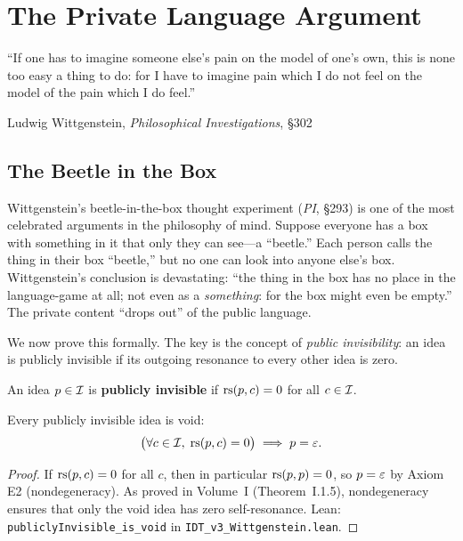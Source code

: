 
\chapter{The Private Language Argument}
\label{ch:private-language}

\epigraph{``If one has to imagine someone else's pain on the model of one's
own, this is none too easy a thing to do: for I have to imagine pain which I
do not feel on the model of the pain which I do feel.''}{Ludwig Wittgenstein, \textit{Philosophical Investigations}, \S302}

\section{The Beetle in the Box}

Wittgenstein's beetle-in-the-box thought experiment (\textit{PI}, \S293) is
one of the most celebrated arguments in the philosophy of mind. Suppose everyone
has a box with something in it that only they can see---a ``beetle.'' Each person
calls the thing in their box ``beetle,'' but no one can look into anyone else's
box. Wittgenstein's conclusion is devastating: ``the thing in the box has no
place in the language-game at all; not even as a \emph{something}: for the box
might even be empty.'' The private content ``drops out'' of the public language.

We now prove this formally. The key is the concept of \emph{public invisibility}:
an idea is publicly invisible if its outgoing resonance to every other idea is
zero.

\begin{definition}
\label{def:public-invisibility}
An idea $p \in \mathcal{I}$ is \textbf{publicly invisible} if $\mathrm{rs}(p, c) = 0$ for all
$c \in \mathcal{I}$.
\end{definition}

\begin{theorem}
\label{thm:beetle-drops-out}
Every publicly invisible idea is void:
\[
\bigl(\forall c \in \mathcal{I},\; \mathrm{rs}(p, c) = 0\bigr) \implies p = \varepsilon.
\]
\end{theorem}

\begin{proof}
If $\mathrm{rs}(p, c) = 0$ for all $c$, then in particular $\mathrm{rs}(p, p) = 0$, so
$p = \varepsilon$ by Axiom E2 (nondegeneracy). As proved in Volume~I (Theorem~I.1.5),
nondegeneracy ensures that only the void idea has zero self-resonance.
Lean: \texttt{publiclyInvisible\_is\_void} in \texttt{IDT\_v3\_Wittgenstein.lean}.
\end{proof}

